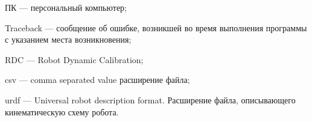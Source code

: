 \newpage
\begin{abbreviations}


ПК --- персональный компьютер;

Traceback --- сообщение об ошибке, возникшей во время выполнения программы с указанием места возникновения;

RDC --- Robot Dynamic Calibration;

csv --- comma separated value расширение файла;

urdf --- Universal robot description format. Расширение файла, описывающего кинематическую схему робота.

\end{abbreviations}
